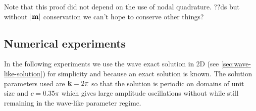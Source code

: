 
Note that this proof did not depend on the use of nodal quadrature.
??ds but without $|\mathbf{m}|$ conservation we can't hope to conserve other things?


\subsection{Numerical experiments}
\label{sec:numer-exper}

In the following experiments we use the wave exact solution in 2D (see \cref{sec:wave-like-solution}) for simplicity and because an exact solution is known.
The solution parameters used are $\mathbf{k} = 2\pi$ so that the solution is periodic on domains of unit size and $c = 0.35\pi$ which gives large amplitude oscillations without while still remaining in the wave-like parameter regime.

